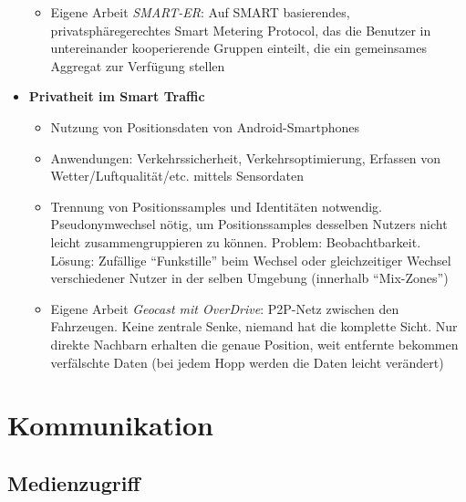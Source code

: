 \begin{itemize}
\begin{itemize}
\begin{itemize}
		\end{itemize}
		\item Eigene Arbeit \textit{SMART-ER}: Auf SMART basierendes, privatsphäregerechtes Smart Metering Protocol, das die Benutzer in untereinander kooperierende Gruppen einteilt, die ein gemeinsames Aggregat zur Verfügung stellen
	\end{itemize}
	\item \textbf{Privatheit im Smart Traffic}
	\begin{itemize}
		\item Nutzung von Positionsdaten von Android-Smartphones
		\item Anwendungen: Verkehrssicherheit, Verkehrsoptimierung, Erfassen von Wetter/Luftqualität/etc. mittels Sensordaten
		\item Trennung von Positionssamples und Identitäten notwendig. Pseudonymwechsel nötig, um Positionssamples desselben Nutzers nicht leicht zusammengruppieren zu können. Problem: Beobachtbarkeit. Lösung: Zufällige "`Funkstille"' beim Wechsel oder gleichzeitiger Wechsel verschiedener Nutzer in der selben Umgebung (innerhalb "`Mix-Zones"')
		\item Eigene Arbeit \textit{Geocast mit OverDrive}: P2P-Netz zwischen den Fahrzeugen. Keine zentrale Senke, niemand hat die komplette Sicht. Nur direkte Nachbarn erhalten die genaue Position, weit entfernte bekommen verfälschte Daten (bei jedem Hopp werden die Daten leicht verändert)
	\end{itemize}
\end{itemize}



\section{Kommunikation}

\subsection{Medienzugriff}

